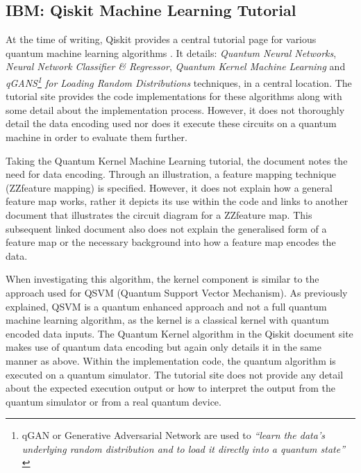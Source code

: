 \subsection{IBM: Qiskit Machine Learning Tutorial}
At the time of writing, Qiskit provides a central tutorial page for various quantum machine learning algorithms \citep{QML_Tutorial}. It details: \emph{Quantum Neural Networks}, \emph{Neural Network Classifier \& Regressor}, \emph{Quantum Kernel Machine Learning} and \emph{qGANS\footnote{qGAN or Generative Adversarial Network are used to \emph{``learn the data’s underlying random distribution and to load it directly into a quantum state''} \citep{QiskitqGAN}} for Loading Random Distributions} techniques, in a central location. The tutorial site provides the code implementations for these algorithms along with some detail about the implementation process. However, it does not thoroughly detail the data encoding used nor does it execute these circuits on a quantum machine in order to evaluate them further. 

Taking the Quantum Kernel Machine Learning tutorial, the document notes the need for data encoding. Through an illustration, a feature mapping technique (ZZfeature mapping) is specified. However, it does not explain how a general feature map works, rather it depicts its use within the code and links to another document that illustrates the circuit diagram for a ZZfeature map. This subsequent linked document also does not explain the generalised form of a feature map or the necessary background into how a feature map encodes the data.

When investigating this algorithm, the kernel component is similar to the approach used for QSVM (Quantum Support Vector Mechanism). As previously explained, QSVM is a quantum enhanced approach and not a full quantum machine learning algorithm, as the kernel is a classical kernel with quantum encoded data inputs. The Quantum Kernel algorithm in the Qiskit document site makes use of quantum data encoding but again only details it in the same manner as above. Within the implementation code, the quantum algorithm is executed on a quantum simulator. The tutorial site does not provide any detail about the expected execution output or how to interpret the output from the quantum simulator or from a real quantum device.

